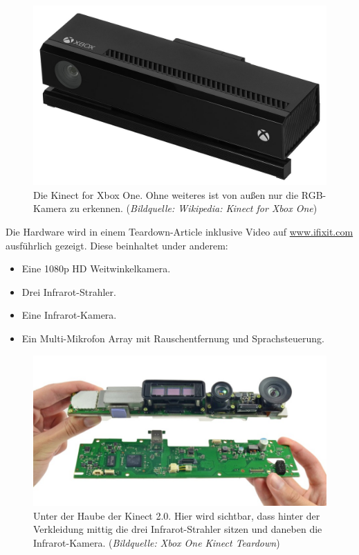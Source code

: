 \documentclass[12pt,a4paper,ngerman]{scrartcl}
\begin{document}
\begin{figure}[H]
    \centering
    \includegraphics[scale=1]{img/kinect2.jpg}
    \caption{Die Kinect for Xbox One. Ohne weiteres ist von außen nur die RGB-Kamera zu erkennen. ({\em Bildquelle: Wikipedia: Kinect for Xbox One\cite{kinect2:wikikinect}})}
\end{figure}

Die Hardware wird in einem Teardown-Article inklusive Video auf \url{www.ifixit.com} ausführlich gezeigt.\cite{kinect2:teardown} Diese beinhaltet under anderem:
\begin{itemize}
\item Eine 1080p HD Weitwinkelkamera.\cite{kinect2:teardown}
\item Drei Infrarot-Strahler.\cite{kinect2:infrared}
\item Eine Infrarot-Kamera.\cite{kinect2:teardown}
\item Ein Multi-Mikrofon Array mit Rauschentfernung und Sprachsteuerung.\cite{kinect2:teardown}
\end{itemize}

\begin{figure}[H]
    \centering
    \includegraphics[scale=0.7]{img/kinect2_components.jpg}
    \caption{Unter der Haube der Kinect 2.0. Hier wird sichtbar, dass hinter der Verkleidung mittig die drei Infrarot-Strahler sitzen und daneben die Infrarot-Kamera. ({\em Bildquelle: Xbox One Kinect Teardown\cite{kinect2:teardown}})}
\end{figure}
\end{document}
